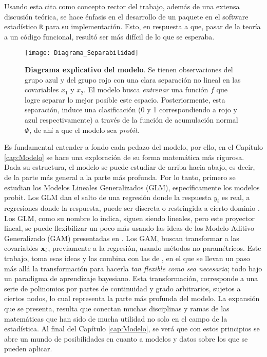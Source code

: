 \documentclass[../Main/Main.tex]{subfiles}
\begin{document}
Usando esta cita como concepto rector del trabajo, además de una extensa discusión teórica, se hace énfasis en el desarrollo de un paquete en el software estadístico \verb|R| para su implementación. Esto, en respuesta a que, pasar de la teoría a un código funcional, resultó ser más difícil de lo que se esperaba. 

\begin{figure}[h]
  \centering
      \texttt{[image: Diagrama\_Separabilidad]}
  \caption{\textbf{Diagrama explicativo del modelo}. Se tienen observaciones del grupo azul y del grupo rojo con una clara separación no lineal en las covariables $x_1$ y $x_2$. El modelo busca \textit{entrenar} una función $f$ que logre separar lo mejor posible este espacio. Posteriormente, esta separación, induce una clasificación (0 y 1 correspondiendo a rojo y azul respectivamente) a través de la función de acumulación normal $\Phi$, de ahí a que el modelo sea \textit{probit}.}
 \label{fig:DiagramaIntro}
\end{figure}

Es fundamental entender a fondo cada pedazo del modelo, por ello, en el Capítulo \ref{cap:Modelo} se hace una exploración de su forma matemática más rigurosa. Dada su estructura, el modelo  se puede estudiar de arriba hacia abajo, es decir, de la parte más general a la parte más profunda. Por lo tanto, primero se estudian los Modelos Lineales Generalizados (GLM), específicamente los modelos probit. Los GLM dan el salto de una regresión donde la respuesta $y_i$ es real, a regresiones donde la respuesta, puede ser discreta o restringida a cierto dominio \autocite{maccullagh1989generalized}. Los GLM, como su nombre lo indica, siguen siendo lineales, pero este proyector lineal, se puede flexibilizar un poco más usando las ideas de los Modelo Aditivo Generalizado (GAM) presentadas en \autocite{hastie1986generalized}. Los GAM, buscan transformar a las covariables $\mathbf{x}_i$, previamente a la regresión, usando métodos no paramétricos. Este trabajo, toma esas ideas y las combina con las de \autocite{mallik1998automatic}, en el que se llevan un paso más allá la transformación para hacerla \textit{tan flexible como sea necesaria}; todo bajo un paradigma de aprendizaje bayesiano. Esta transformación, corresponde a una serie de polinomios por partes de continuidad y grado arbitrarios, sujetos a ciertos nodos, lo cual representa la parte más profunda del modelo. La expansión que se presenta, resulta que conectan muchas disciplinas y ramas de las matemáticas que han sido de mucha utilidad no solo en el campo de la estadística. Al final del Capítulo \ref{cap:Modelo}, se verá que con estos principios se abre un mundo de posibilidades en cuanto a modelos y datos sobre los que se pueden aplicar.
\end{document}
